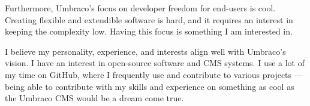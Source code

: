 \documentclass[11pt, a4paper]{awesome-cv}
\begin{document}
\begin{cvletter}
Furthermore, Umbraco's focus on developer freedom for end-users is cool. Creating flexible and extendible software is hard, and it requires an interest in keeping the complexity low. Having this focus is something I am interested in.

I believe my personality, experience, and interests align well with Umbraco's vision. I have an interest in open-source software and CMS systems. I use a lot of my time on GitHub, where I frequently use and contribute to various projects — being able to contribute with my skills and experience on something as cool as the Umbraco CMS would be a dream come true. 

\end{cvletter}


\makeletterclosing
\end{document}
